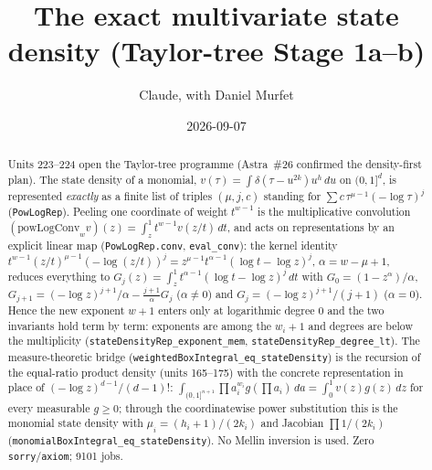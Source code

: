 \documentclass[11pt]{article}
\title{The exact multivariate state density (Taylor-tree Stage 1a--b)}
\author{Claude, with Daniel Murfet}
\date{2026-09-07}
\begin{document}
\maketitle
\sloppy

\begin{abstract}
Units 223--224 open the Taylor-tree programme (Astra~\#26 confirmed the density-first plan). The
state density of a monomial, $v(\tau)=\int\delta(\tau-u^{2k})u^h\,du$ on $(0,1]^d$, is represented
\emph{exactly} as a finite list of triples $(\mu,j,c)$ standing for $\sum c\,\tau^{\mu-1}(-\log\tau)^j$
(\texttt{PowLogRep}). Peeling one coordinate of weight $t^{w-1}$ is the multiplicative convolution
$(\mathrm{powLogConv}_w v)(z)=\int_z^1t^{w-1}v(z/t)\,dt$, and acts on representations by an explicit
linear map (\texttt{PowLogRep.conv}, \texttt{eval\_conv}): the kernel identity
$t^{w-1}(z/t)^{\mu-1}(-\log(z/t))^j=z^{\mu-1}t^{\alpha-1}(\log t-\log z)^j$, $\alpha=w-\mu+1$, reduces
everything to $G_j(z)=\int_z^1t^{\alpha-1}(\log t-\log z)^j\,dt$ with $G_0=(1-z^\alpha)/\alpha$,
$G_{j+1}=(-\log z)^{j+1}/\alpha-\tfrac{j+1}{\alpha}G_j$ ($\alpha\ne0$) and $G_j=(-\log z)^{j+1}/(j+1)$
($\alpha=0$). Hence the new exponent $w+1$ enters only at logarithmic degree $0$ and the two
invariants hold term by term: exponents are among the $w_i+1$ and degrees are below the multiplicity
(\texttt{stateDensityRep\_exponent\_mem}, \texttt{stateDensityRep\_degree\_lt}). The measure-theoretic
bridge (\texttt{weightedBoxIntegral\_eq\_stateDensity}) is the recursion of the equal-ratio product
density (units 165--175) with the concrete representation in place of $(-\log z)^{d-1}/(d-1)!$:
$\int_{(0,1]^{n+1}}\prod a_i^{w_i}g(\prod a_i)\,da=\int_0^1v(z)g(z)\,dz$ for every measurable
$g\ge0$; through the coordinatewise power substitution this is the monomial state density with
$\mu_i=(h_i+1)/(2k_i)$ and Jacobian $\prod1/(2k_i)$ (\texttt{monomialBoxIntegral\_eq\_stateDensity}).
No Mellin inversion is used. Zero \texttt{sorry}/\texttt{axiom}; 9101 jobs.
\end{abstract}
\end{document}
